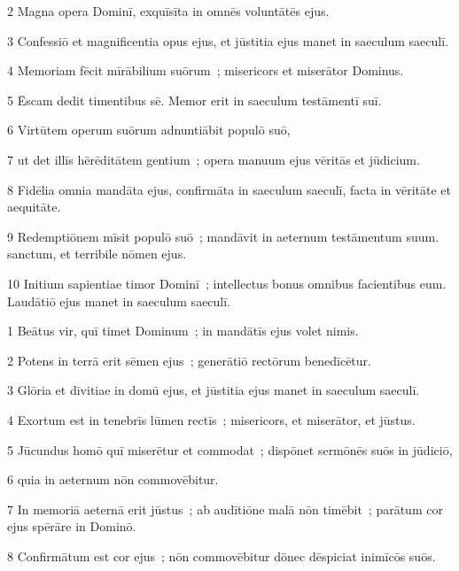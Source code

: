 \psalmVerse
  {\phantom{00}2}
  {Magna opera Dominī, exquīsīta in omnēs voluntātēs ejus.}


\psalmVerse
  {\phantom{00}3}
  {Confessiō et magnificentia opus ejus, et jūstitia ejus manet in saeculum saeculī.}


\psalmVerse
  {\phantom{00}4}
  {Memoriam fēcit mīrābilium suōrum~; misericors et miserātor Dominus.}


\psalmVerse
  {\phantom{00}5}
  {Ēscam dedit timentibus sē. Memor erit in saeculum testāmentī suī.}


\psalmVerse
  {\phantom{00}6}
  {Virtūtem operum suōrum adnuntiābit populō suō,}


\psalmVerse
  {\phantom{00}7}
  {ut det illīs hērēditātem gentium~; opera manuum ejus vēritās et jūdicium.}


\psalmVerse
  {\phantom{00}8}
  {Fidēlia omnia mandāta ejus, confirmāta in saeculum saeculī, facta in vēritāte et aequitāte.}


\psalmVerse
  {\phantom{00}9}
  {Redemptiōnem mīsit populō suō~; mandāvit in aeternum testāmentum suum. sanctum, et terribile nōmen ejus.}


\psalmVerse
  {\phantom{0}10}
  {Initium sapientiae timor Dominī~; intellectus bonus omnibus facientibus eum. Laudātiō ejus manet in saeculum saeculī.}



\psalmVerse
  {\phantom{00}1}
  {Beātus vir, quī timet Dominum~; in mandātīs ejus volet nimis.}


\psalmVerse
  {\phantom{00}2}
  {Potens in terrā erit sēmen ejus~; generātiō rectōrum benedīcētur.}


\psalmVerse
  {\phantom{00}3}
  {Glōria et dīvitiae in domū ejus, et jūstitia ejus manet in saeculum saeculī.}


\psalmVerse
  {\phantom{00}4}
  {Exortum est in tenebrīs lūmen rectīs~; misericors, et miserātor, et jūstus.}


\psalmVerse
  {\phantom{00}5}
  {Jūcundus homō quī miserētur et commodat~; dispōnet sermōnēs suōs in jūdiciō,}


\psalmVerse
  {\phantom{00}6}
  {quia in aeternum nōn commovēbitur.}


\psalmVerse
  {\phantom{00}7}
  {In memoriā aeternā erit jūstus~; ab audītiōne malā nōn timēbit~; parātum cor ejus spērāre in Dominō.}


\psalmVerse
  {\phantom{00}8}
  {Confirmātum est cor ejus~; nōn commovēbitur dōnec dēspiciat inimīcōs suōs.}



